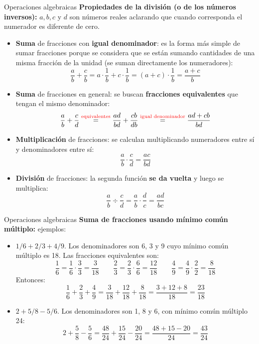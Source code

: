 \documentclass[9pt, aspectratio=169]{beamer}
\begin{document}
\begin{frame}{Operaciones algebraicas}
    \textbf{Propiedades de la división (o de los números inversos):} $a, b, c$ y $d$ son números reales aclarando que cuando corresponda el numerador es diferente de cero.
\begin{itemize}
\item \textbf{Suma} de fracciones con \textbf{igual denominador}: es la forma más simple de sumar fracciones porque se considera que se están sumando cantidades de una misma fracción de la unidad (se suman directamente los numeradores):
    \[ \frac{a}{b} + \frac{c}{b} = a \cdot \frac{1}{b} + c \cdot \frac{1}{b} = (a + c) \cdot \frac{1}{b} = \frac{a + c}{b} \]
\item \textbf{Suma} de fracciones en general: se buscan \textbf{fracciones equivalentes} que tengan el mismo denominador:
    \[ \frac{a}{b} + \frac{c}{d} \stackrel{\text{\textcolor{red}{equivalentes}}}{=} \frac{ad}{bd} + \frac{cb}{db} \stackrel{\text{\textcolor{red}{igual denominador}}}{=} \frac{ad + cb}{bd} \]
\item \textbf{Multiplicación} de fracciones: se calculan multiplicando numeradores entre sí y denominadores entre sí:
    \[ \frac{a}{b} \cdot \frac{c}{d} = \frac{ac}{bd} \]
\item \textbf{División} de fracciones: la segunda función \textbf{se da vuelta} y luego se multiplica: 
    \[ \frac{a}{b} \div \frac{c}{d} = \frac{a}{b} \cdot \frac{d}{c} = \frac{ad}{bc} \]
\end{itemize}
\end{frame}

\begin{frame}{Operaciones algebraicas}
    \textbf{Suma de fracciones usando mínimo común múltiplo:} ejemplos:
\begin{itemize}
    \item $1/6 + 2/3 + 4/9$. Los denominadores son 6, 3 y 9 cuyo mínimo común múltiplo es 18. Las fracciones equivalentes son:
        \[ \frac{1}{6} = \frac{1}{6} \cdot \frac{3}{3} = \frac{3}{18} \qquad \frac{2}{3} = \frac{2}{3} \cdot \frac{6}{6} = \frac{12}{18} \qquad \frac{4}{9} = \frac{4}{9} \cdot \frac{2}{2} = \frac{8}{18} \]
        Entonces:
        \[ \frac{1}{6} + \frac{2}{3} + \frac{4}{9} = \frac{3}{18} + \frac{12}{18} + \frac{8}{18} = \frac{3 +12 + 8}{18} = \frac{23}{18} \]
\item $2 + 5/8 - 5/6$. Los denominadores son 1, 8  y 6, con mínimo común múltiplo 24:
    \[ 2 + \frac{5}{8} - \frac{5}{6} = \frac{48}{24} + \frac{15}{24} - \frac{20}{24} = \frac{48 + 15 - 20}{24} = \frac{43}{24} \]
\end{itemize}
\end{frame}
\end{document}
